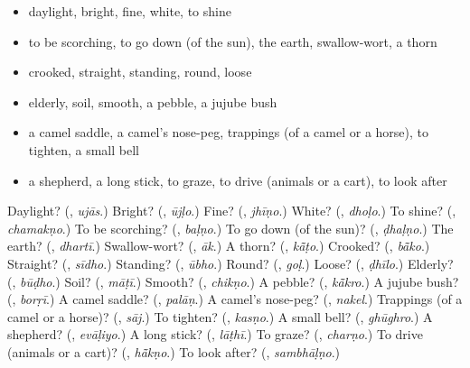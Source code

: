 \begin{itemize}
\raggedright
  \item daylight, bright, fine, white, to shine
  \item to be scorching, to go down (of the sun), the earth, swallow-wort, a thorn
  \item crooked, straight, standing, round, loose
  \item elderly, soil, smooth, a pebble, a jujube bush
  \item a camel saddle, a camel's nose-peg, trappings (of a camel or a horse), to tighten, a small bell
  \item a shepherd, a long stick, to graze, to drive (animals or a cart), to look after
\end{itemize}

\begin{tcolorbox}[breakable,colback=teal!4,colframe=teal!35!black,title={Before you move on}]
Daylight? (\textbf{}, \emph{ujās}.) Bright? (\textbf{}, \emph{ūjḷo}.) Fine? (\textbf{}, \emph{jhīṇo}.) White? (\textbf{}, \emph{dhoḷo}.) To shine? (\textbf{}, \emph{chamakṇo}.) To be scorching? (\textbf{}, \emph{baḷṇo}.) To go down (of the sun)? (\textbf{}, \emph{ḍhaḷṇo}.) The earth? (\textbf{}, \emph{dhartī}.) Swallow-wort? (\textbf{}, \emph{āk}.) A thorn? (\textbf{}, \emph{kā̃ṭo}.) Crooked? (\textbf{}, \emph{bā̃ko}.) Straight? (\textbf{}, \emph{sīdho}.) Standing? (\textbf{}, \emph{ūbho}.) Round? (\textbf{}, \emph{goḷ}.) Loose? (\textbf{}, \emph{ḍhīlo}.) Elderly? (\textbf{}, \emph{būḍho}.) Soil? (\textbf{}, \emph{māṭī}.) Smooth? (\textbf{}, \emph{chikṇo}.) A pebble? (\textbf{}, \emph{kā̃kro}.) A jujube bush? (\textbf{}, \emph{borṛī}.) A camel saddle? (\textbf{}, \emph{palāṇ}.) A camel's nose-peg? (\textbf{}, \emph{nakel}.) Trappings (of a camel or a horse)? (\textbf{}, \emph{sāj}.) To tighten? (\textbf{}, \emph{kasṇo}.) A small bell? (\textbf{}, \emph{ghūghro}.) A shepherd? (\textbf{}, \emph{evāḷiyo}.) A long stick? (\textbf{}, \emph{lāṭhī}.) To graze? (\textbf{}, \emph{charṇo}.) To drive (animals or a cart)? (\textbf{}, \emph{hā̃kṇo}.) To look after? (\textbf{}, \emph{sambhāḷṇo}.)
\end{tcolorbox}
